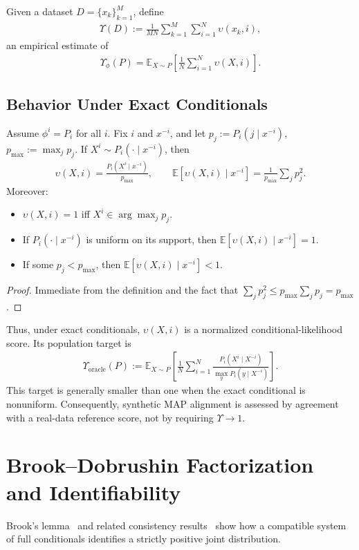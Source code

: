 \documentclass[runningheads]{llncs}
\def\EQSP{3pt}
\newcommand{\cgather}[2][\EQSP]{\begingroup\setlength\abovedisplayskip{#1}\setlength\belowdisplayskip{#1}\begin{gather} #2 \end{gather}\endgroup\noindent}
\begin{document}
Given a dataset $D=\{x_{k}\}_{k=1}^M$, define
\cgather{
    \Upsilon(D)
    :=
    \frac{1}{MN}
    \sum_{k=1}^M\sum_{i=1}^N
    \upsilon(x_{k},i),
}
an empirical estimate of
\cgather{
    \Upsilon_\phi(P)
    =
    \mathbb{E}_{X\sim P}
    \left[
        \frac{1}{N}\sum_{i=1}^N \upsilon(X,i)
    \right].
}
\subsection{Behavior Under Exact Conditionals}

\begin{lemma}
\label{lem:map}
Assume $\phi^i = P_i$ for all $i$.
Fix $i$ and $x^{-i}$, and let $p_j := P_i(j\mid x^{-i})$,
$p_{\max} := \max_j p_j$.
If $X^i \sim P_i(\cdot\mid x^{-i})$, then
\cgather{
    \upsilon(X,i) = \frac{P_i(X^i\mid x^{-i})}{p_{\max}},
\qquad
    \mathbb{E}[\upsilon(X,i)\mid x^{-i}]
    =
    \frac{1}{p_{\max}}\sum_j p_j^2.
}
Moreover:
\begin{itemize}
\item $\upsilon(X,i)=1$ iff $X^i\in\arg\max_j p_j$.
\item If $P_i(\cdot\mid x^{-i})$ is uniform on its support,
      then $\mathbb{E}[\upsilon(X,i)\mid x^{-i}] = 1$.
\item If some $p_j < p_{\max}$, then
      $\mathbb{E}[\upsilon(X,i)\mid x^{-i}] < 1$.
\end{itemize}
\end{lemma}

\begin{proof}
Immediate from the definition and the fact that
$\sum_j p_j^2 \le p_{\max}\sum_j p_j = p_{\max}$.
\end{proof}

Thus, under exact conditionals, $\upsilon(X,i)$ is a normalized
conditional-likelihood score. Its population target is
\cgather{
    \Upsilon_{\mathrm{oracle}}(P)
    :=
    \mathbb{E}_{X\sim P}
    \left[
        \frac{1}{N}\sum_{i=1}^N
        \frac{P_i(X^i\mid X^{-i})}
             {\max_y P_i(y\mid X^{-i})}
    \right].
    \label{eq:oracle_ratio}}
This target is generally smaller than one when the exact conditional is
nonuniform. Consequently, synthetic MAP alignment is assessed by agreement with a
real-data reference score, not by requiring $\Upsilon\to1$.

\section{Brook--Dobrushin Factorization and Identifiability}
Brook's lemma~\cite{brook1964} and related consistency results~\cite{dobrushin1968}
show how a compatible system of full conditionals identifies a strictly
positive joint distribution.
\end{document}
